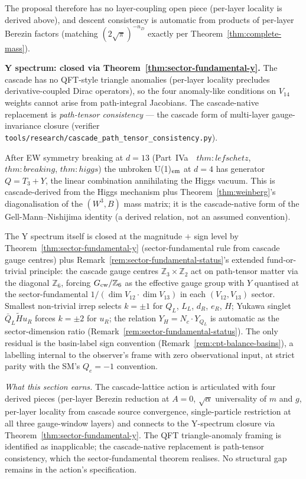 \documentclass[12pt,a4paper]{article}
\begin{document}
The proposal therefore has no layer-coupling open piece (per-layer
locality is derived above), and descent consistency is automatic from
products of per-layer Berezin factors (matching $(2\sqrt{\pi})^{-n_D}$
exactly per Theorem~\ref{thm:complete-mass}).

\medskip\noindent\textbf{Y spectrum: closed via Theorem~\ref{thm:sector-fundamental-y}.}
The cascade has no QFT-style triangle anomalies (per-layer locality
precludes derivative-coupled Dirac operators), so the four
anomaly-like conditions on $V_{14}$ weights cannot arise from
path-integral Jacobians. The cascade-native replacement is
\emph{path-tensor consistency} --- the cascade form of multi-layer
gauge-invariance closure (verifier
\texttt{tools/research/cascade\_path\_tensor\_consistency.py}).

After EW symmetry breaking at $d=13$
(Part~IVa~\cite{part4a}~$\mathit{thm{:}lefschetz}$, $\mathit{thm{:}breaking}$,
$\mathit{thm{:}higgs}$) the unbroken U(1)$_{\rm em}$ at $d=4$ has
generator $Q = T_3 + Y$, the linear combination annihilating the
Higgs vacuum. This is cascade-derived from the Higgs mechanism
plus Theorem~\ref{thm:weinberg}'s diagonalisation of the $(W^3, B)$
mass matrix; it is the cascade-native form of the
Gell-Mann--Nishijima identity (a derived relation, not an assumed
convention).

The Y spectrum itself is closed at the magnitude $+$ sign level
by Theorem~\ref{thm:sector-fundamental-y} (sector-fundamental rule
from cascade gauge centres) plus
Remark~\ref{rem:sector-fundamental-status}'s extended fund-or-trivial
principle: the cascade gauge centres
$\mathbb{Z}_3 \times \mathbb{Z}_2$ act on path-tensor matter via
the diagonal $\mathbb{Z}_6$, forcing $G_{\rm cw}/\mathbb{Z}_6$ as
the effective gauge group with $Y$ quantised at the
sector-fundamental
$1/(\dim V_{12} \cdot \dim V_{13})$ in each $(V_{12}, V_{13})$
sector. Smallest non-trivial irrep selects $k = \pm 1$ for $Q_L$,
$L_L$, $d_R$, $e_R$, $H$; Yukawa singlet
$\bar Q_L \widetilde H u_R$ forces $k = \pm 2$ for $u_R$; the
relation $Y_H = N_c \cdot Y_{Q_L}$ is automatic as the
sector-dimension ratio
(Remark~\ref{rem:sector-fundamental-status}). The only residual is
the basin-label sign convention
(Remark~\ref{rem:cpt-balance-basins}), a labelling internal to the
observer's frame with zero observational input, at strict parity
with the SM's $Q_e = -1$ convention.

\medskip\noindent\emph{What this section earns.} The cascade-lattice
action is articulated with four derived pieces (per-layer Berezin
reduction at $A=0$, $\sqrt{\alpha}$ universality of $m$ and $g$,
per-layer locality from cascade source convergence, single-particle
restriction at all three gauge-window layers) and connects to the
Y-spectrum closure via Theorem~\ref{thm:sector-fundamental-y}. The
QFT triangle-anomaly framing is identified as inapplicable; the
cascade-native replacement is path-tensor consistency, which the
sector-fundamental theorem realises. No structural gap remains in
the action's specification.
\end{document}
